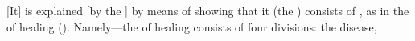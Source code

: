 [It]%
 is explained [by the \Bhasyakara] by means of showing that it (the \sastra)
consists of , as in the \sastra\/ of healing (\cikitsasastra). %
Namely---the \sastra\/ of healing consists of four divisions: the disease,
